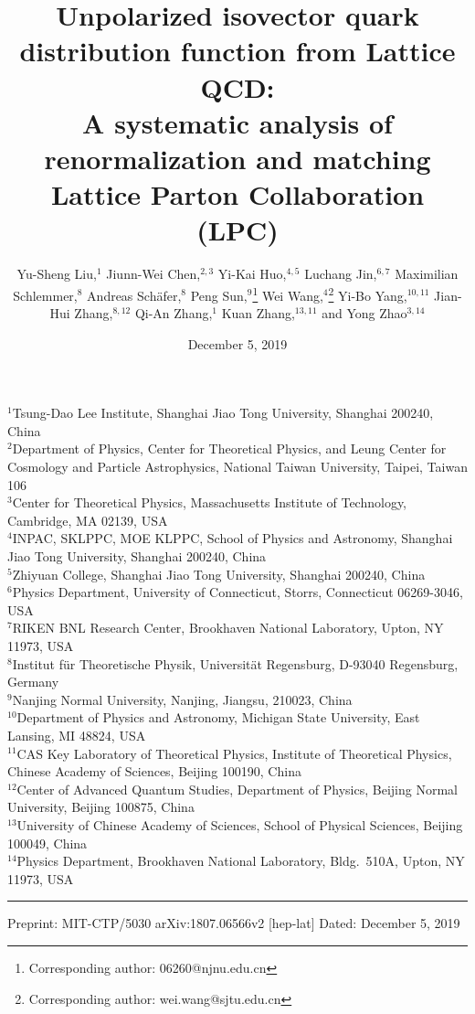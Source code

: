 \documentclass[11pt]{article}
\title{Unpolarized isovector quark distribution function from Lattice QCD:\\
A systematic analysis of renormalization and matching\\[1.2ex]
\large Lattice Parton Collaboration (LPC)}
\author{Yu-Sheng Liu,$^{1}$%
 Jiunn-Wei Chen,$^{2,3}$%
 Yi-Kai Huo,$^{4,5}$%
 Luchang Jin,$^{6,7}$%
 Maximilian Schlemmer,$^{8}$%
 Andreas Sch\"afer,$^{8}$%
 Peng Sun,$^{9}$\footnote{Corresponding author: 06260@njnu.edu.cn}%
 Wei Wang,$^{4}$\footnote{Corresponding author: wei.wang@sjtu.edu.cn}%
 Yi-Bo Yang,$^{10,11}$%
 Jian-Hui Zhang,$^{8,12}$%
 Qi-An Zhang,$^{1}$%
 Kuan Zhang,$^{13,11}$%
 and Yong Zhao$^{3,14}$}
\date{December 5, 2019}
\begin{document}
\maketitle

\noindent\begin{minipage}{\textwidth}
\footnotesize
\begin{flushleft}
$^{1}$Tsung-Dao Lee Institute, Shanghai Jiao Tong University, Shanghai 200240, China\\
$^{2}$Department of Physics, Center for Theoretical Physics, and Leung Center for Cosmology and Particle Astrophysics, National Taiwan University, Taipei, Taiwan 106\\
$^{3}$Center for Theoretical Physics, Massachusetts Institute of Technology, Cambridge, MA 02139, USA\\
$^{4}$INPAC, SKLPPC, MOE KLPPC, School of Physics and Astronomy, Shanghai Jiao Tong University, Shanghai 200240, China\\
$^{5}$Zhiyuan College, Shanghai Jiao Tong University, Shanghai 200240, China\\
$^{6}$Physics Department, University of Connecticut, Storrs, Connecticut 06269-3046, USA\\
$^{7}$RIKEN BNL Research Center, Brookhaven National Laboratory, Upton, NY 11973, USA\\
$^{8}$Institut f\"ur Theoretische Physik, Universit\"at Regensburg, D-93040 Regensburg, Germany\\
$^{9}$Nanjing Normal University, Nanjing, Jiangsu, 210023, China\\
$^{10}$Department of Physics and Astronomy, Michigan State University, East Lansing, MI 48824, USA\\
$^{11}$CAS Key Laboratory of Theoretical Physics, Institute of Theoretical Physics, Chinese Academy of Sciences, Beijing 100190, China\\
$^{12}$Center of Advanced Quantum Studies, Department of Physics, Beijing Normal University, Beijing 100875, China\\
$^{13}$University of Chinese Academy of Sciences, School of Physical Sciences, Beijing 100049, China\\
$^{14}$Physics Department, Brookhaven National Laboratory, Bldg.\ 510A, Upton, NY 11973, USA
\end{flushleft}
\hrule\vspace{0.4ex}
\noindent Preprint: MIT-CTP/5030 \quad arXiv:1807.06566v2 [hep-lat] \quad Dated: December 5, 2019
\end{minipage}
\vspace{1em}
\end{document}
